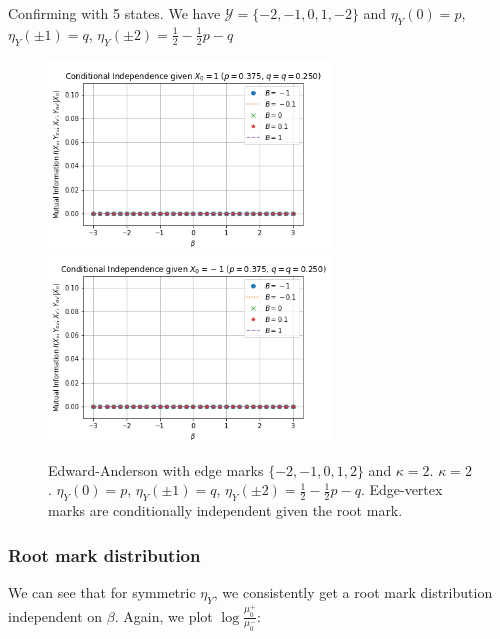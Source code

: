 \documentclass[12pt]{article}
\numberwithin{equation}{section}
\begin{document}
\newpage

Confirming with 5 states. We have $\mathcal{Y}=\{-2, -1, 0, 1, -2\}$ and $\eta_Y(0)=p$, $\eta_Y(\pm 1)=q$, $\eta_Y(\pm 2)=\frac12-\frac12p-q$

\begin{figure}[h]
    \centering
    \includegraphics[width=7.5cm]{img/EA_x1_x2_x0=1_5s_p=0.38_q=0.25_kappa=2.png}
    \includegraphics[width=7.5cm]{img/EA_x1_x2_x0=-1_5s_p=0.38_q=0.25_kappa=2.png}
    \caption{Edward-Anderson with edge marks $\{-2, -1, 0, 1, 2\}$ and $\kappa=2$. $\kappa=2$. $\eta_Y(0)=p$, $\eta_Y(\pm 1)=q$, $\eta_Y(\pm 2)=\frac12-\frac12p-q$. Edge-vertex marks are conditionally independent given the root mark.}
    \label{Fig.EA-CI-k2-5s}
\end{figure}

\newpage

\subsubsection{Root mark distribution}

We can see that for symmetric $\eta_Y$, we consistently get a root mark distribution independent on $\beta$. Again, we plot $\log\frac{\mu_0^+}{\mu_0^-}$:
\end{document}

